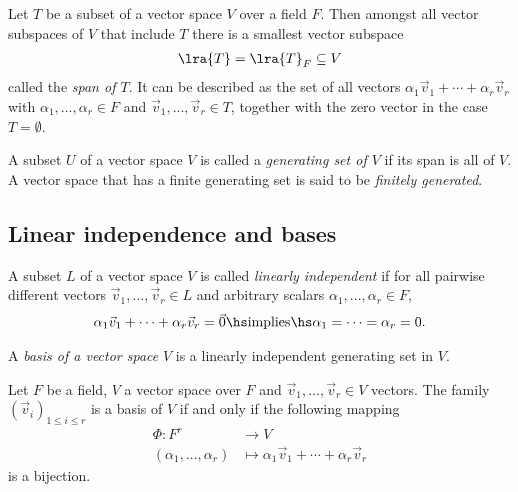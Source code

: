\documentclass{article}
\begin{document}
\begin{proposition}[Notes 1.4.5]
	Let $T$ be a subset of a vector space $V$ over a field $F$. Then amongst all
	vector subspaces of $V$ that include $T$ there is a smallest vector subspace
	\begin{align*}
		\lra{T} = \lra{T}_F\subseteq V
	\end{align*}
	called the \emph{span of $T$}.
	It can be described as the set of all vectors $\alpha_1\vec v_1+\cdots+\alpha_r\vec v_r$
	with $\alpha_1,...,\alpha_r\in F$ and $\vec v_1,...,\vec v_r\in T$, together
	with the zero vector in the case $T=\emptyset$.
\end{proposition}

\begin{definition}
	A subset $U$ of a vector space $V$ is called a \emph{generating set of $V$}
	if its span is all of $V$. A vector space that has a finite generating set
	is said to be \emph{finitely generated}.
\end{definition}

\subsection{Linear independence and bases}

\begin{definition}
	A subset $L$ of a vector space $V$ is called \emph{linearly independent}
	if for all pairwise different vectors $\vec v_1,...,\vec v_r\in L$ and
	arbitrary scalars $\alpha_1,...,\alpha_r\in F$,
	\begin{align*}
		\alpha_1\vec v_1+\cdots+\alpha_r\vec v_r = \vec 0
		\hs\text{implies}\hs
		\alpha_1=\cdots=\alpha_r=0.
	\end{align*}
\end{definition}

\begin{definition}
	A \emph{basis of a vector space} $V$ is a linearly independent generating
	set in $V$.
\end{definition}

\begin{theorem}[Notes 1.5.11]
	Let $F$ be a field, $V$ a vector space over $F$ and $\vec v_1,...,\vec v_r\in V$
	vectors. The family $\left(\vec v_i\right)_{1\leq i\leq r}$ is a basis of $V$
	if and only if the following mapping
	\begin{align*}
		\Phi:F^r                & \to V                                                \\
		(\alpha_1,...,\alpha_r) & \mapsto \alpha_1\vec v_1 + \cdots + \alpha_r\vec v_r
	\end{align*}
	is a bijection.
\end{theorem}
\end{document}
